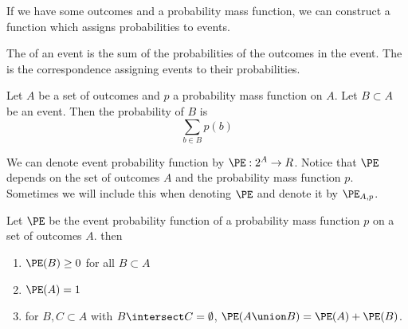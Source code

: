 

If we have some outcomes and
a probability mass function,
we can construct a function which
assigns probabilities to events.


The 
of an event is the sum
of the probabilities of
the outcomes in the event.
The 
is the correspondence assigning
events to their probabilities.


Let $A$ be a set of outcomes
and $p$ a probability mass function
on $A$.
Let $B \subset A$ be an event.
Then the probability of $B$
is
\[
  \sum_{b \in B} p(b)
\]

We can denote event probability function
by $\PE: 2^A \to R$.
Notice that $\PE$ depends on the set of
outcomes $A$ and the probability mass function
$p$. Sometimes we will include this when
denoting $\PE$ and denote it by $\PE_{A, p}$.


\begin{prop}
Let $\PE$ be the event probability function
of a probability mass function $p$ on a set
of outcomes $A$. then
\begin{enumerate}
\item $\PE(B) \geq 0$ for all $B \subset A$
\item $\PE(A) = 1$
\item for $B, C \subset A$ with $B \intersect C = \emptyset$,
  $\PE(A \union B) = \PE(A) + \PE(B)$.
\end{enumerate}
\end{prop}


